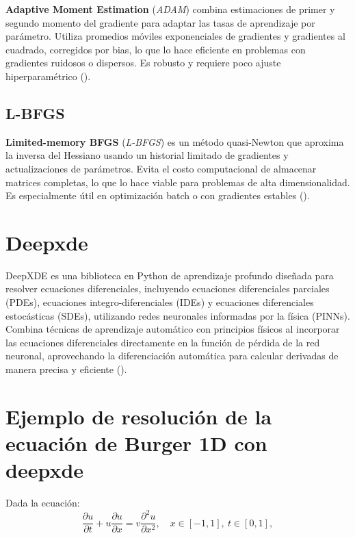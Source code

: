 \documentclass[
  spanish,
  us-letterpaper,
]{scrreprt}
\theoremstyle{plain}
\theoremstyle{definition}
\theoremstyle{remark}
\begin{document}
\textbf{Adaptive Moment Estimation} (\emph{ADAM}) combina estimaciones
de primer y segundo momento del gradiente para adaptar las tasas de
aprendizaje por parámetro. Utiliza promedios móviles exponenciales de
gradientes y gradientes al cuadrado, corregidos por bias, lo que lo hace
eficiente en problemas con gradientes ruidosos o dispersos. Es robusto y
requiere poco ajuste hiperparamétrico
().

\subsection{L-BFGS}\label{l-bfgs}

\textbf{Limited-memory BFGS} (\emph{L-BFGS}) es un método quasi-Newton
que aproxima la inversa del Hessiano usando un historial limitado de
gradientes y actualizaciones de parámetros. Evita el costo computacional
de almacenar matrices completas, lo que lo hace viable para problemas de
alta dimensionalidad. Es especialmente útil en optimización batch o con
gradientes estables ().

\section{Deepxde}\label{deepxde}

DeepXDE es una biblioteca en Python de aprendizaje profundo diseñada
para resolver ecuaciones diferenciales, incluyendo ecuaciones
diferenciales parciales (PDEs), ecuaciones integro-diferenciales (IDEs)
y ecuaciones diferenciales estocásticas (SDEs), utilizando redes
neuronales informadas por la física (PINNs). Combina técnicas de
aprendizaje automático con principios físicos al incorporar las
ecuaciones diferenciales directamente en la función de pérdida de la red
neuronal, aprovechando la diferenciación automática para calcular
derivadas de manera precisa y eficiente ().

\section{Ejemplo de resolución de la ecuación de Burger 1D con
deepxde}\label{ejemplo-de-resoluciuxf3n-de-la-ecuaciuxf3n-de-burger-1d-con-deepxde}

Dada la ecuación: \[
\dfrac{\partial u}{\partial t} + u\dfrac{\partial u}{\partial x} = v\dfrac{\partial^2 u}{\partial x^2}, \quad x \in[-1,1], \ t\in[0,1],
\]
\end{document}
